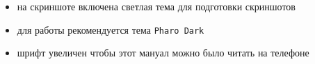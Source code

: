\clearpage
{}



\begin{itemize}
\item на скриншоте включена светлая тема для подготовки скриншотов
\item для работы рекомендуется тема \texttt{Pharo Dark}
\item шрифт увеличен чтобы этот мануал можно было читать на телефоне
\end{itemize}    



